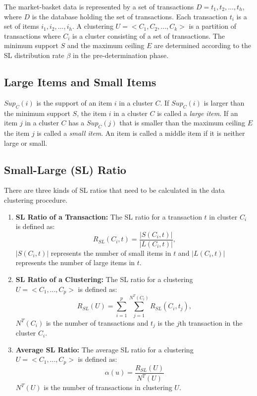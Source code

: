 \documentclass[11pt,reqno]{amsart}
\theoremstyle{definition}
\numberwithin{equation}{subsection}
\begin{document}
The market-basket data is represented by a set of transactions $D = {t_1, t_2, ..., t_h}$, where $D$ is the database holding the set of transactions. Each transaction $t_i$ is a set of items ${i_1, i_2,...,i_h}$. A clustering $U =< C_1, C_2, ..., C_k>$ is a partition of transactions where $C_i$ is a cluster consisting of a set of transactions. The minimum support $S$ and the maximum ceiling $E$ are determined according to the SL distribution rate $\beta$ in the pre-determination phase. 

\subsection{Large Items and Small Items}


$Sup_C(i)$ is the support of an item $i$ in a cluster $C$. If $Sup_C(i)$ is larger than the minimum support $S$, the item $i$ in a cluster $C$ is  called a {\em large item}. If an item $j$ in a cluster $C$ has a $Sup_C(j)$ that is smaller than the maximum ceiling $E$ the item $j$ is called a {\em small item}. An item is called a middle item if it is neither large or small.

\subsection{Small-Large (SL) Ratio}

There are three kinds of SL ratios that need to be calculated in the data clustering procedure.
	\begin{enumerate}


	\item \textbf{SL Ratio of a Transaction:} The SL ratio for a transaction $t$ in cluster $C_i$ is defined as:
	$$R_{SL}(C_i, t) = \frac{|S(C_i,t)|}{|L(C_i, t)|} ,$$
$|S(C_i,t)|$ represents the number of small items in $t$ and $|L(C_i,t)|$ represents the number of large items in $t$.


	\item \textbf{SL Ratio of a Clustering:} The SL ratio for a clustering $U = <C_1, ..., C_p>$ is defined as:
	$$R_{SL}(U) = \sum_{i=1}^{p} \sum_{j=1}^{N^T(C_i)} R_{SL}(C_i, t_j), $$
	$N^T(C_i)$ is the number of transactions and $t_j$ is the $j$th transaction in the cluster $C_i$. 
	
	
	
	\item \textbf{Average SL Ratio:} The average SL ratio for a clustering $U =<C_1, ..., C_p>$ is defined as:
	$$\alpha(u) = \frac{R_{SL}(U)}{N^T(U)}$$
	$N^T(U)$ is the number of transactions in clustering $U$.
	
	\end{enumerate}
\end{document}
